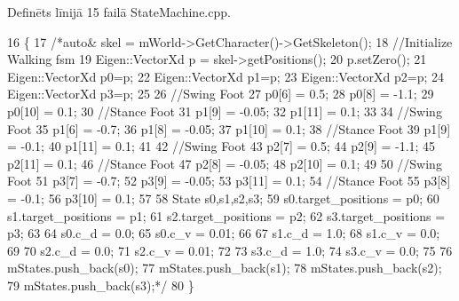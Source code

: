 Definēts līnijā 15 failā State\+Machine.\+cpp.


\begin{DoxyCode}
16 \{
17     \textcolor{comment}{/*auto& skel = mWorld->GetCharacter()->GetSkeleton();}
18 \textcolor{comment}{    //Initialize Walking fsm}
19 \textcolor{comment}{    Eigen::VectorXd p = skel->getPositions();}
20 \textcolor{comment}{    p.setZero();}
21 \textcolor{comment}{    Eigen::VectorXd p0=p;}
22 \textcolor{comment}{    Eigen::VectorXd p1=p;}
23 \textcolor{comment}{    Eigen::VectorXd p2=p;}
24 \textcolor{comment}{    Eigen::VectorXd p3=p;}
25 \textcolor{comment}{}
26 \textcolor{comment}{    //Swing Foot}
27 \textcolor{comment}{    p0[6] = 0.5;}
28 \textcolor{comment}{    p0[8] = -1.1;}
29 \textcolor{comment}{    p0[10] = 0.1;}
30 \textcolor{comment}{    //Stance Foot}
31 \textcolor{comment}{    p1[9] = -0.05;}
32 \textcolor{comment}{    p1[11] = 0.1;}
33 \textcolor{comment}{}
34 \textcolor{comment}{    //Swing Foot}
35 \textcolor{comment}{    p1[6] = -0.7;}
36 \textcolor{comment}{    p1[8] = -0.05;}
37 \textcolor{comment}{    p1[10] = 0.1;}
38 \textcolor{comment}{    //Stance Foot}
39 \textcolor{comment}{    p1[9] = -0.1;}
40 \textcolor{comment}{    p1[11] = 0.1;}
41 \textcolor{comment}{}
42 \textcolor{comment}{    //Swing Foot}
43 \textcolor{comment}{    p2[7] = 0.5;}
44 \textcolor{comment}{    p2[9] = -1.1;}
45 \textcolor{comment}{    p2[11] = 0.1;}
46 \textcolor{comment}{    //Stance Foot}
47 \textcolor{comment}{    p2[8] = -0.05;}
48 \textcolor{comment}{    p2[10] = 0.1;}
49 \textcolor{comment}{}
50 \textcolor{comment}{    //Swing Foot}
51 \textcolor{comment}{    p3[7] = -0.7;}
52 \textcolor{comment}{    p3[9] = -0.05;}
53 \textcolor{comment}{    p3[11] = 0.1;}
54 \textcolor{comment}{    //Stance Foot}
55 \textcolor{comment}{    p3[8] = -0.1;}
56 \textcolor{comment}{    p3[10] = 0.1;}
57 \textcolor{comment}{}
58 \textcolor{comment}{    State s0,s1,s2,s3;}
59 \textcolor{comment}{    s0.target\_positions = p0;}
60 \textcolor{comment}{    s1.target\_positions = p1;}
61 \textcolor{comment}{    s2.target\_positions = p2;}
62 \textcolor{comment}{    s3.target\_positions = p3;}
63 \textcolor{comment}{}
64 \textcolor{comment}{    s0.c\_d = 0.0;}
65 \textcolor{comment}{    s0.c\_v = 0.01;}
66 \textcolor{comment}{}
67 \textcolor{comment}{    s1.c\_d = 1.0;}
68 \textcolor{comment}{    s1.c\_v = 0.0;}
69 \textcolor{comment}{}
70 \textcolor{comment}{    s2.c\_d = 0.0;}
71 \textcolor{comment}{    s2.c\_v = 0.01;}
72 \textcolor{comment}{}
73 \textcolor{comment}{    s3.c\_d = 1.0;}
74 \textcolor{comment}{    s3.c\_v = 0.0;}
75 \textcolor{comment}{}
76 \textcolor{comment}{    mStates.push\_back(s0);}
77 \textcolor{comment}{    mStates.push\_back(s1);}
78 \textcolor{comment}{    mStates.push\_back(s2);}
79 \textcolor{comment}{    mStates.push\_back(s3);*/}
80 \}
\end{DoxyCode}


